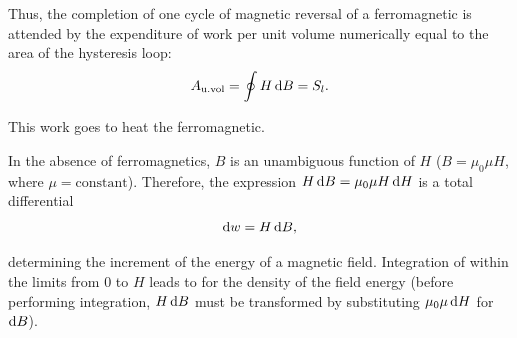 Thus, the completion of one cycle of magnetic reversal of a ferromagnetic is attended by the expenditure of work per unit volume numerically equal to the area of the hysteresis loop:
\begin{equation}\label{eq:8_47}
	A_{\text{u.vol}} = \oint H\, \mathrm{d} B = S_l.
\end{equation}

\noindent
This work goes to heat the ferromagnetic.

In the absence of ferromagnetics, $B$ is an unambiguous function of $H$ ($B=\mu_0\mu H$, where $\mu=\text{constant}$).
Therefore, the expression $H\,\mathrm{d} B=\mu_0\mu H\, \mathrm{d} H$ is a total differential
\begin{equation}\label{eq:8_48}
	\mathrm{d} w = H\,\mathrm{d} B,
\end{equation}

\noindent
determining the increment of the energy of a magnetic field.
Integration of  within the limits from $0$ to $H$ leads to  for the density of the field energy (before performing integration, $H\,\mathrm{d} B$ must be transformed by substituting $\mu_0\mu\,\mathrm{d} H$ for $\mathrm{d} B$).
